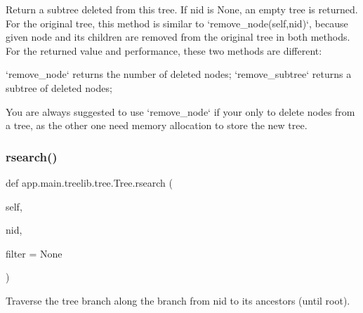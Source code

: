 \begin{DoxyVerb}Return a subtree deleted from this tree. If nid is None, an
empty tree is returned.
For the original tree, this method is similar to
`remove_node(self,nid)`, because given node and its children
are removed from the original tree in both methods.
For the returned value and performance, these two methods are
different:

    `remove_node` returns the number of deleted nodes;
    `remove_subtree` returns a subtree of deleted nodes;

You are always suggested to use `remove_node` if your only to
delete nodes from a tree, as the other one need memory
allocation to store the new tree.
\end{DoxyVerb}
 \mbox{\label{classapp_1_1main_1_1treelib_1_1tree_1_1Tree_a04080e6799c3bbc702b13953b466d757}} 
\subsubsection{\texorpdfstring{rsearch()}{rsearch()}}
{\footnotesize\ttfamily def app.\+main.\+treelib.\+tree.\+Tree.\+rsearch (\begin{DoxyParamCaption}\item[{}]{self,  }\item[{}]{nid,  }\item[{}]{filter = {\ttfamily None} }\end{DoxyParamCaption})}

\begin{DoxyVerb}Traverse the tree branch along the branch from nid to its
ancestors (until root).
\end{DoxyVerb}
 \mbox{\label{classapp_1_1main_1_1treelib_1_1tree_1_1Tree_acfa08f527ee2152c58e090e3c5a698a1}} 
